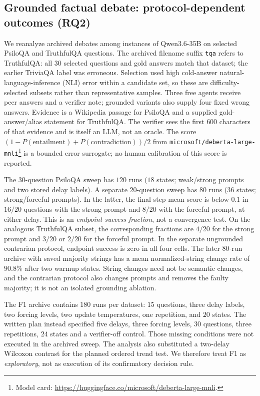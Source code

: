 \documentclass[11pt]{article}
\theoremstyle{definition}
\begin{document}
\subsection{Grounded factual debate: protocol-dependent outcomes (RQ2)}

We reanalyze archived debates among instances of Qwen3.6-35B on selected PsiloQA
\cite{PsiloQA} and TruthfulQA \cite{TruthfulQA} questions. The archived filename suffix \texttt{tqa} refers to TruthfulQA: all $30$ selected
questions and gold answers match that dataset; the earlier TriviaQA label was erroneous.
Selection used high cold-answer natural-language-inference (NLI) error
within a candidate set, so these are difficulty-selected subsets rather than representative samples.
Three free agents receive peer answers and a verifier note; grounded variants also supply four fixed
wrong answers. Evidence is a Wikipedia passage for PsiloQA and a supplied gold-answer/alias statement
for TruthfulQA. The verifier sees the first $600$ characters of that evidence and is itself an LLM,
not an oracle. The score $(1-P(\mathrm{entailment})+P(\mathrm{contradiction}))/2$ from
\texttt{microsoft/deberta-large-mnli}\footnote{Model card:
\url{https://huggingface.co/microsoft/deberta-large-mnli}.}
is a bounded error surrogate; no human calibration of this score is reported.

The $30$-question PsiloQA sweep has $120$ runs ($18$ states; weak/strong prompts and two stored
delay labels). A separate $20$-question sweep has $80$ runs ($36$ states; strong/forceful prompts).
In the latter, the final-step mean score is below $0.1$ in $16/20$ questions with the strong prompt
and $8/20$ with the forceful prompt, at either delay. This is an \emph{endpoint success fraction},
not a convergence test. On the analogous TruthfulQA subset, the corresponding fractions are $4/20$
for the strong prompt and $3/20$ or $2/20$ for the forceful prompt. In the separate ungrounded
contrarian protocol, endpoint success is zero in all four cells. The later $80$-run archive with
saved majority strings has a mean normalized-string change rate of $90.8\%$ after two warmup states.
String changes need not be semantic changes, and the contrarian protocol also changes prompts and
removes the faulty majority; it is not an isolated grounding ablation.

The F1 archive contains $180$ runs per dataset: $15$ questions, three delay labels, two forcing
levels, two update temperatures, one repetition, and $20$ states. The written plan instead specified
five delays, three forcing levels, $30$ questions, three repetitions, $24$ states and a verifier-off
control. Those missing conditions were not executed in the archived sweep. The analysis also
substituted a two-delay Wilcoxon contrast for the planned ordered trend test. We therefore treat F1
as \emph{exploratory}, not as execution of its confirmatory decision rule.
\end{document}
